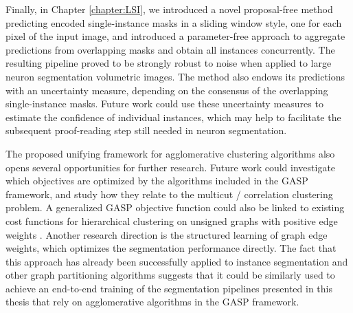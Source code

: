 Finally, in Chapter \ref{chapter:LSI}, we introduced a novel proposal-free method predicting encoded single-instance masks in a sliding window style, one for each pixel of the input image, and introduced a parameter-free approach to aggregate predictions from overlapping masks and obtain all instances concurrently. The resulting pipeline proved to be strongly robust to noise when applied to large neuron segmentation volumetric images. 
The method also endows its predictions with an uncertainty measure, depending on the consensus of the overlapping  single-instance masks. Future work could use these uncertainty measures to estimate the confidence of individual instances, which may help to facilitate the subsequent proof-reading step still needed in neuron segmentation.

The proposed unifying framework for agglomerative clustering algorithms also opens several opportunities for further research. Future work could investigate which objectives are optimized by the algorithms included in the GASP framework, and study how they relate to the multicut / correlation clustering problem. A generalized GASP objective function could also be linked to existing cost functions for hierarchical clustering on unsigned graphs with positive edge weights \cite{moseley2017approximation,cohen2019hierarchical,dasgupta2016cost}. 
Another research direction is the structured learning of graph edge weights, which optimizes the segmentation performance directly. The fact that this approach has already been successfully applied to instance segmentation and other graph partitioning algorithms \cite{funke2018large,kong2018recurrentPix,wolf2017learned,cerrone2019end} suggests that it could be similarly used to achieve an end-to-end training of the segmentation pipelines presented in this thesis that rely on agglomerative algorithms in the GASP framework.
